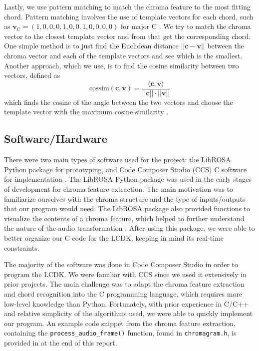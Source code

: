 \documentclass[journal]{IEEEtran}
\begin{document}
Lastly, we use pattern matching to match the chroma feature to the most fitting chord.
Pattern matching involves the use of template vectors for each chord, such as $\mathbf{v}_{\text{C}} = (1, 0, 0, 0, 1, 0, 0, 1, 0, 0, 0, 0)$ for major C \cite{jiang}.
We try to match the chroma vector to the closest template vector and from that get the corresponding chord.
One simple method is to just find the Euclidean distance $||\mathbf{c} - \mathbf{v}||$ between the chroma vector and each of the template vectors and see which is the smallest.
Another approach, which we use,  is to find the cosine similarity between two vectors, defined as 
\begin{equation}
    \text{cossim}(\mathbf{c}, \mathbf{v}) = \frac{\langle\mathbf{c}, \mathbf{v}\rangle}{||\mathbf{c}|| \cdot ||\mathbf{v}||}
    \label{eq:cossim}
\end{equation}
which finds the cosine of the angle between the two vectors and choose the template vector with the maximum cosine similarity \cite{jiang}.


\subsection{Software/Hardware}
There were two main types of software used for the project: the LibROSA Python package for prototyping, and Code Composer Studio (CCS) C software for implementation \cite{librosa, ccs}.
The LibROSA Python package was used in the early stages of development for chroma feature extraction.
The main motivation was to familiarize ourselves with the chroma structure and the type of inputs/outputs that our program would need.
The LibROSA package also provided functions to visualize the contents of a chroma feature, which helped to further understand the nature of the audio transformation \cite{librosa}.
After using this package, we were able to better organize our C code for the LCDK, keeping in mind its real-time constraints.

The majority of the software was done in Code Composer Studio in order to program the LCDK.
We were familiar with CCS since we used it extensively in prior projects.
The main challenge was to adapt the chroma feature extraction and chord recognition into the C programming language, which requires more low-level knowledge than Python.
Fortunately, with prior experience in C/C++ and relative simplicity of the algorithms used, we were able to quickly implement our program.
An example code snippet from the chroma feature extraction, containing the \texttt{process\_audio\_frame()} function, found in \texttt{chromagram.h}, is provided in  at the end of this report.
\end{document}
